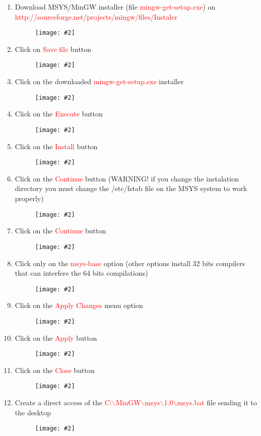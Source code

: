 \documentclass[a4paper]{article}
\newcommand{\FIG}[2]
{
	\begin{figure}[ht!]
	\centering
	\texttt{[image: \#2]}
	\end{figure}
}
\newcommand{\FIGURE}[1]{\FIG{0.35}{#1}}
\newcommand{\RED}[1] {\textcolor{red}{#1}}
\begin{document}
\begin{enumerate}

\item Download MSYS/MinGW installer (file \RED{mingw-get-setup.exe}) on \newline
\RED{http://sourceforge.net/projects/mingw/files/Instaler}

\FIGURE{msys-1.png}

\item Click on \RED{Save file} button
\FIGURE{msys-2.png}

\clearpage

\item Click on the downloaded \RED{mingw-get-setup.exe} installer
\FIGURE{msys-3.png}

\item Click on the \RED{Execute} button
\FIGURE{msys-4.png}

\clearpage

\item Click on the \RED{Install} button
\FIGURE{msys-5.png}

\item Click on the \RED{Continue} button (WARNING! if you change the instalation
directory you must change the /etc/fstab file on the MSYS system to work
properly)
\FIGURE{msys-6.png}

\clearpage

\item Click on the \RED{Continue} button
\FIGURE{msys-7.png}

\item Click only on the \RED{msys-base} option (other options install 32 bits
compilers that can interfere the 64 bits compilations)
\FIGURE{msys-8.png}

\clearpage

\item Click on the \RED{Apply Changes} menu option
\FIGURE{msys-9.png}

\item Click on the \RED{Apply} button
\FIGURE{msys-10.png}

\clearpage

\item Click on the \RED{Close} button
\FIGURE{msys-11.png}

\item Create a direct access of the
\RED{C:$\backslash$MinGW$\backslash$msys$\backslash$1.0$\backslash$msys.bat}
file sending it to the desktop
\FIGURE{msys-12.png}

\clearpage


\end{enumerate}
\end{document}
